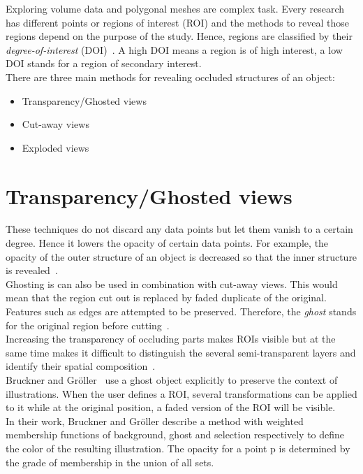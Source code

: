 
Exploring volume data and polygonal meshes are complex task. Every research has different points or regions of interest (ROI) and the methods to reveal those regions depend on the purpose of the study. Hence, regions are classified by their \emph{degree-of-interest} (DOI)~\cite{proc:intelligentCutaway}. A high DOI means a region is of high interest, a low DOI stands for a region of secondary interest.\\
There are three main methods for revealing occluded structures of an object:
\begin{itemize}
	\item Transparency/Ghosted views
	\item Cut-away views
	\item Exploded views
\end{itemize}

\section{Transparency/Ghosted views}
These techniques do not discard any data points but let them vanish to a certain degree. Hence it lowers the opacity of certain data points. For example, the opacity of the outer structure of an object is decreased so that the inner structure is revealed~\cite{jour:correa}.\\
Ghosting is can also be used in combination with cut-away views. This would mean that the region cut out is replaced by faded duplicate of the original. Features such as edges are attempted to be preserved. Therefore, the \emph{ghost} stands for the original region before cutting~\cite{proc:volumeshop}.\\
Increasing the transparency of occluding parts makes ROIs visible but at the same time makes it difficult to distinguish the several semi-transparent layers and identify their spatial composition~\cite{jour:interactiveCutaway}.\\
Bruckner and Gr{\"o}ller~\cite{proc:volumeshop} use a ghost object explicitly to preserve the context of illustrations. When the user defines a ROI, several transformations can be applied to it while at the original position, a faded version of the ROI will be visible.\\
In their work, Bruckner and Gr{\"o}ller describe a method with weighted membership functions of background, ghost and selection respectively to define the color of the resulting illustration. The opacity for a point p is determined by the grade of membership in the union of all sets.

